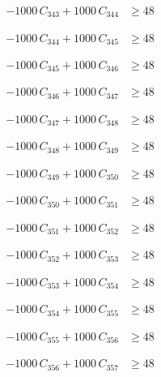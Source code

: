 \documentclass[a4paper,11pt]{article}
\begin{document}
\begin{align}
-1000\,C_{343} + 1000\,C_{344} &\geq 48 \nonumber
\end{align}

\begin{align}
-1000\,C_{344} + 1000\,C_{345} &\geq 48 \nonumber
\end{align}

\begin{align}
-1000\,C_{345} + 1000\,C_{346} &\geq 48 \nonumber
\end{align}

\begin{align}
-1000\,C_{346} + 1000\,C_{347} &\geq 48 \nonumber
\end{align}

\begin{align}
-1000\,C_{347} + 1000\,C_{348} &\geq 48 \nonumber
\end{align}

\begin{align}
-1000\,C_{348} + 1000\,C_{349} &\geq 48 \nonumber
\end{align}

\begin{align}
-1000\,C_{349} + 1000\,C_{350} &\geq 48 \nonumber
\end{align}

\begin{align}
-1000\,C_{350} + 1000\,C_{351} &\geq 48 \nonumber
\end{align}

\begin{align}
-1000\,C_{351} + 1000\,C_{352} &\geq 48 \nonumber
\end{align}

\begin{align}
-1000\,C_{352} + 1000\,C_{353} &\geq 48 \nonumber
\end{align}

\begin{align}
-1000\,C_{353} + 1000\,C_{354} &\geq 48 \nonumber
\end{align}

\begin{align}
-1000\,C_{354} + 1000\,C_{355} &\geq 48 \nonumber
\end{align}

\begin{align}
-1000\,C_{355} + 1000\,C_{356} &\geq 48 \nonumber
\end{align}

\begin{align}
-1000\,C_{356} + 1000\,C_{357} &\geq 48 \nonumber
\end{align}
\end{document}
